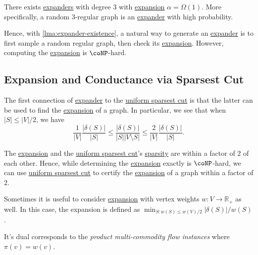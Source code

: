 \begin{lemma}\label{lma:expander-existence}
	There exists \hyperref[def:expander]{expanders} with degree \(3\) with \hyperref[def:expansion]{expansion} \(\alpha = \Omega (1)\). More specifically, a random \(3\)-regular graph is an \hyperref[def:expander]{expander} with high probability.
\end{lemma}

Hence, with \autoref{lma:expander-existence}, a natural way to generate an \hyperref[def:expander]{expander} is to first sample a random regular graph, then check its \hyperref[def:expansion]{expansion}. However, computing the \hyperref[def:expansion]{expansion} is \(\coNP\)-hard.

\subsection{Expansion and Conductance via Sparsest Cut}
The first connection of \hyperref[def:expander]{expander} to the \hyperref[prb:sparsest-cut]{uniform sparsest cut} is that the latter can be used to find the \hyperref[def:expansion]{expansion} of a graph. In particular, we see that when \(\lvert S \rvert \leq \lvert V \rvert / 2\), we have
\[
	\frac{1}{\lvert V \rvert } \frac{\lvert \delta (S) \rvert }{\lvert S \rvert }
	\leq \frac{\lvert \delta (S) \rvert }{\lvert S \rvert \lvert V \setminus S \rvert }
	\leq \frac{2}{\lvert V \rvert } \frac{\lvert \delta (S) \rvert }{\lvert S \rvert }.
\]

\begin{remark}\label{rmk:expansion-sparsity}
	The \hyperref[def:expansion]{expansion} and the \hyperref[prb:sparsest-cut]{uniform sparsest cut}'s \hyperref[def:sparsity]{sparsity} are within a factor of \(2\) of each other. Hence, while determining the \hyperref[def:expansion]{expansion} exactly is \(\coNP\)-hard, we can use \hyperref[prb:sparsest-cut]{uniform sparsest cut} to certify the \hyperref[def:expansion]{expansion} of a graph within a factor of \(2\).
\end{remark}

Sometimes it is useful to consider \hyperref[def:expansion]{expansion} with vertex weights \(w \colon V \to \mathbb{R} _+\) as well. In this case, the expansion is defined as \(\min _{S \colon w(S) \leq w(V) / 2} \lvert \delta (S) \rvert / w(S)\).

\begin{note}
	It's dual corresponds to the \emph{product multi-commodity flow instances} where \(\pi (v) = w(v)\).
\end{note}

